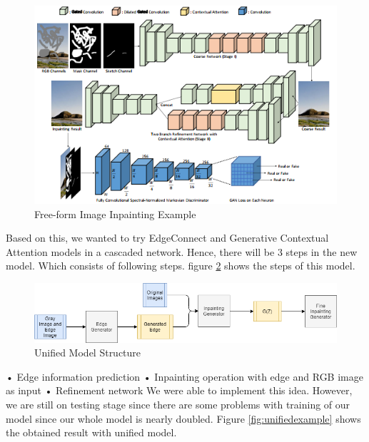 \begin{figure}[h]
    \centering
    \includegraphics[scale=0.5]{figures/chapter5/Free-form.PNG}
    \caption{Free-form Image Inpainting Example}
    \label{fig:freeform}
\end{figure}

Based on this, we wanted to try EdgeConnect and Generative Contextual Attention models in a cascaded network. Hence, there will be 3 steps in the new model. Which consists of following steps. figure \ref{fig:unifiedIdeda} shows the steps of this model. 


\begin{figure}[h]
    \centering
    \includegraphics[scale=0.5]{figures/chapter5/Unified.png}
    \caption{Unified Model Structure}
    \label{fig:unifiedIdeda}
\end{figure}

•	Edge information prediction \newline
•	Inpainting operation with edge and RGB image as input \newline
•	Refinement network  \newline
We were able to implement this idea. However, we are still on testing stage since there are some problems with training of our model since our whole model is nearly doubled. Figure \ref{fig:unifiedexample} shows the obtained result with unified model.

